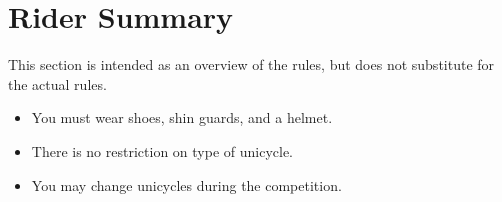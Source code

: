 \section{Rider Summary}

This section is intended as an overview of the rules, but does not substitute for the actual rules.
\begin{itemize}
\item You must wear shoes, shin guards, and a helmet.
\item There is no restriction on type of unicycle.
\item You may change unicycles during the competition.
\end{itemize}
